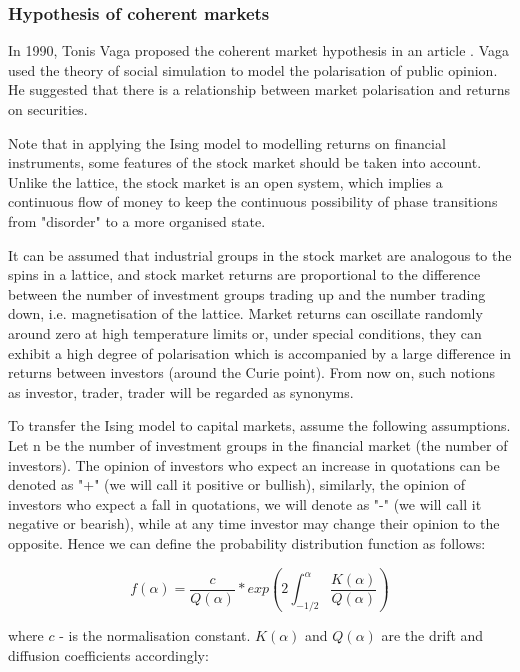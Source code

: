 \subsubsection*{Hypothesis of coherent markets}  In 1990, Tonis Vaga proposed the coherent market hypothesis in an article \cite{vaga} . Vaga used the theory of social simulation to model the polarisation of public opinion. He suggested that there is a relationship between market polarisation and returns on securities.

Note that in applying the Ising model to modelling returns on financial instruments, some features of the stock market should be taken into account. Unlike the lattice, the stock market is an open system, which implies a continuous flow of money to keep the continuous possibility of phase transitions from "disorder" to a more organised state. 

It can be assumed that industrial groups in the stock market are analogous to the spins in a lattice, and stock market returns are proportional to the difference between the number of investment groups trading up and the number trading down, i.e. magnetisation of the lattice. Market returns can oscillate randomly around zero at high temperature limits or, under special conditions, they can exhibit a high degree of polarisation which is accompanied by a large difference in returns between investors (around the Curie point). From now on, such notions as investor, trader, trader will be regarded as synonyms.

To transfer the Ising model to capital markets, assume the following assumptions. Let n be the number of investment groups in the financial market (the number of investors). The opinion of investors who expect an increase in quotations can be denoted as "+" (we will call it positive or bullish), similarly, the opinion of investors who expect a fall in quotations, we will denote as "-" (we will call it negative or bearish), while at any time investor may change their opinion to the opposite. Hence we can define the probability distribution function as follows:
 
 \begin{equation}
 	\label{pdf_cmh}
 	f(\alpha) = \frac{c}{Q(\alpha)} * exp \left( 2 \int_{-1/2}^{\alpha} \frac{K(\alpha)}{Q(\alpha)} \right)
\end{equation}

where $c$ - is the normalisation constant. $K(\alpha)$ and $Q(\alpha)$ are the drift and diffusion coefficients accordingly:

